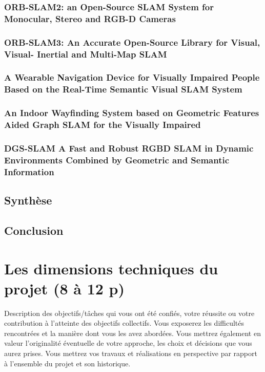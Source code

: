 \documentclass[11pt]{article}
\begin{document}
  \pagebreak

  \subsubsection{ORB-SLAM2: an Open-Source SLAM System for Monocular, Stereo and
  RGB-D Cameras}  

  \pagebreak

  \subsubsection{ORB-SLAM3: An Accurate Open-Source Library for Visual, Visual-
  Inertial and Multi-Map SLAM}

  \pagebreak

  \subsubsection{A Wearable Navigation Device for Visually Impaired People Based on
  the Real-Time Semantic Visual SLAM System}

  \pagebreak

  \subsubsection{An Indoor Wayfinding System based on Geometric Features Aided
  Graph SLAM for the Visually Impaired}  

  \pagebreak
  
  \subsubsection{DGS-SLAM A Fast and Robust RGBD SLAM in Dynamic Environments
  Combined by Geometric and Semantic Information}

  \pagebreak


  \subsection{Synthèse}

  \pagebreak

  \subsection{Conclusion}

  \pagebreak
  \section{Les dimensions techniques du projet (8 à 12 p)}
  Description des objectifs/tâches qui vous ont été confiés, votre réussite ou votre contribution à
  l’atteinte des objectifs collectifs. Vous exposerez les difficultés rencontrées et la manière dont vous
  les avez abordées. Vous mettrez également en valeur l’originalité éventuelle de votre approche, les
  choix et décisions que vous aurez prises. Vous mettrez vos travaux et réalisations en perspective par
  rapport à l’ensemble du projet et son historique.
\end{document}
